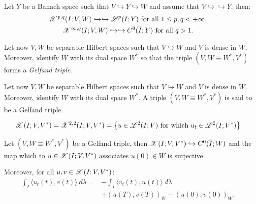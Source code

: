 \begin{theorem}
    Let $Y$ be a Banach space such that $V \hookrightarrow Y \hookrightarrow W$ and assume that $V \hookrightarrow \hookrightarrow Y$, then:
    \begin{gather}
        \mathscr{X}^{p, q}(I; V, W) \hookrightarrow \hookrightarrow \mathscr{L}^{p}(I; Y) \text{ for all } 1 \leq p, q < +\infty,\\
        \mathscr{X}^{\infty, q}(I; V, W) \hookrightarrow \hookrightarrow C^0(\overline{I}; Y) \text{ for all } q > 1.
    \end{gather}
\end{theorem}

Let now $V, W$ be separable Hilbert spaces such that $V \hookrightarrow W$ and $V$ is dense in $W$. Moreover, identify $W$ with its dual space $W^*$ so that the triple $(V, W \equiv W^*, V^*)$ forms a \textit{Gelfand triple}.

\begin{definition}
    Let now $V, W$ be separable Hilbert spaces such that $V \hookrightarrow W$ and $V$ is dense in $W$. Moreover, identify $W$ with its dual space $W^*$. A triple $\left( V, W \equiv W^*, V^* \right)$ is said to be a Gelfand triple.
\end{definition}

\begin{definition}[$\X(I; V, V^*)$]
    \begin{gather}
        \mathscr{X}(I; V, V^*) = \mathscr{X}^{2, 2}(I; V, V^*) = \left\{ u \in \mathscr{L}^{2}(I; V) \text{ for which } u_t \in \mathscr{L}^{2}(I; V^*) \right\}
    \end{gather}
\end{definition}

\begin{theorem}
    Let $\left( V, W \equiv W^*, V^* \right)$ be a Gelfand triple, then $\mathscr{X}(I; V, V^*) \hookrightarrow C^0(\overline{I};W)$ and the map which to $u \in \mathscr{X}(I; V, V^*)$ associates $u(0) \in W$ is surjective.

    Moreover, for all $u, v \in \mathscr{X}(I; V, V^*)$:
    \begin{align}
        \int_I \langle u_t(t), v(t) \rangle ~ d \lambda = & - \int_I \langle v_t(t), u(t) \rangle ~ d \lambda \\
        & + \left( u(T), v(T) \right)_W - \left( u(0), v(0) \right)_W.
    \end{align}
\end{theorem}